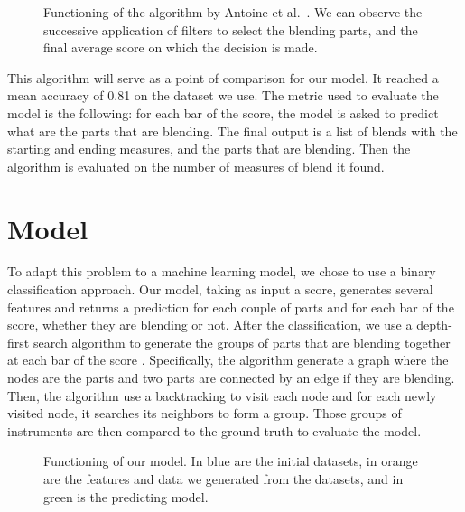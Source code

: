 \documentclass{article}
\newcommand{\todo}[1]{\textcolor{blue}{{\bf TODO}: #1}}
\newcommand{\fm}[1]{\textcolor{magenta}{FM: << #1 >>}}
\begin{document}
\begin{figure}[ht]
  \centerline{}
  \caption{Functioning of the algorithm by Antoine et al.~\cite{antoine_blends}.
  We can observe the successive application of filters to select the blending parts,
  and the final average score on which the decision is made.}
  \label{fig:algo}
\end{figure}


This algorithm will serve as a point of comparison for our model. It reached a mean accuracy of 0.81 on the dataset we use. 
The metric used to evaluate the model is the following: for each bar of the score, the model is asked to predict what are the parts that are blending.
The final output is a list of blends with the starting and ending measures, and the parts that are blending.
Then the algorithm is evaluated on the number of measures of blend it found.

\section{Model}\label{sec:model}

To adapt this problem to a machine learning model, we chose to use a binary classification approach.
Our model, taking as input a score, generates several features and returns a prediction for each couple of parts and for each bar of the score, whether they are blending or not.
After the classification, we use a depth-first search algorithm to generate the groups of parts that are blending together at each bar of the score \cite{even_2011}.
Specifically, the algorithm generate a graph where the nodes are the parts and two parts are connected by an edge if they are blending.
Then, the algorithm use a backtracking to visit each node and for each newly visited node, it searches its neighbors to form a group.
Those groups of instruments are then compared to the ground truth to evaluate the model.

\begin{figure}[ht]
  \centerline{}
  \caption{Functioning of our model.
  In blue are the initial datasets, in orange are the features and data we generated from the datasets,
  and in green is the predicting model.}
  \label{fig:model}
\end{figure}
\end{document}
